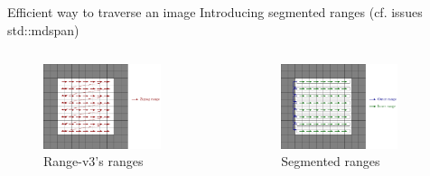 \documentclass[12pt,aspectratio=169]{beamer}
\begin{document}
\begin{frame}[fragile]{Efficient way to traverse an image}
  Introducing segmented ranges (cf. issues std::mdspan)
  \begin{columns}[T,onlytextwidth]
    \begin{figure}
      \includegraphics[width=0.8\textwidth]{../figures/linear_rng}
      \caption{Range-v3's ranges}
    \end{figure}
    
    \begin{figure}
      \includegraphics[width=0.8\textwidth]{../figures/segmented_rng}
      \caption{Segmented ranges}
    \end{figure}
  \end{columns}
\end{frame}
\end{document}
